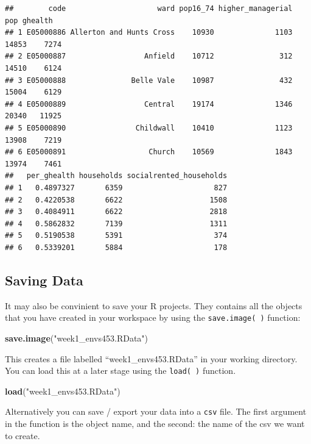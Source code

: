 \documentclass[
]{book}
\newenvironment{Shaded}{\begin{snugshade}}{\end{snugshade}}
\newcommand{\KeywordTok}[1]{\textcolor[rgb]{0.13,0.29,0.53}{\textbf{#1}}}
\newcommand{\NormalTok}[1]{#1}
\newcommand{\StringTok}[1]{\textcolor[rgb]{0.31,0.60,0.02}{#1}}
\begin{document}
\begin{verbatim}
##        code                     ward pop16_74 higher_managerial   pop ghealth
## 1 E05000886 Allerton and Hunts Cross    10930              1103 14853    7274
## 2 E05000887                  Anfield    10712               312 14510    6124
## 3 E05000888               Belle Vale    10987               432 15004    6129
## 4 E05000889                  Central    19174              1346 20340   11925
## 5 E05000890                Childwall    10410              1123 13908    7219
## 6 E05000891                   Church    10569              1843 13974    7461
##   per_ghealth households socialrented_households
## 1   0.4897327       6359                     827
## 2   0.4220538       6622                    1508
## 3   0.4084911       6622                    2818
## 4   0.5862832       7139                    1311
## 5   0.5190538       5391                     374
## 6   0.5339201       5884                     178
\end{verbatim}

\hypertarget{saving-data}{%
\subsection{Saving Data}\label{saving-data}}

It may also be convinient to save your R projects. They contains all the objects that you have created in your workspace by using the \texttt{save.image(\ )} function:

\begin{Shaded}
\begin{Highlighting}[]
\KeywordTok{save.image}\NormalTok{(}\StringTok{"week1_envs453.RData"}\NormalTok{)}
\end{Highlighting}
\end{Shaded}

This creates a file labelled ``week1\_envs453.RData'' in your working directory. You can load this at a later stage using the \texttt{load(\ )} function.

\begin{Shaded}
\begin{Highlighting}[]
\KeywordTok{load}\NormalTok{(}\StringTok{"week1_envs453.RData"}\NormalTok{)}
\end{Highlighting}
\end{Shaded}

Alternatively you can save / export your data into a \texttt{csv} file. The first argument in the function is the object name, and the second: the name of the csv we want to create.
\end{document}

